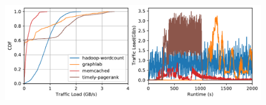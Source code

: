 {\begin{figure}
\begin{minipage}{0.25\textwidth}
\end{minipage}
\begin{minipage}{0.5\textwidth}
\begin{center}
\centerline{\includegraphics[width=\textwidth]{Figures/fig-osdi16-net-trace.pdf}}
\vspace{-0.15in}
{
}
\end{center}
\end{minipage}
\vspace{-0.15in}
\end{figure}
}
